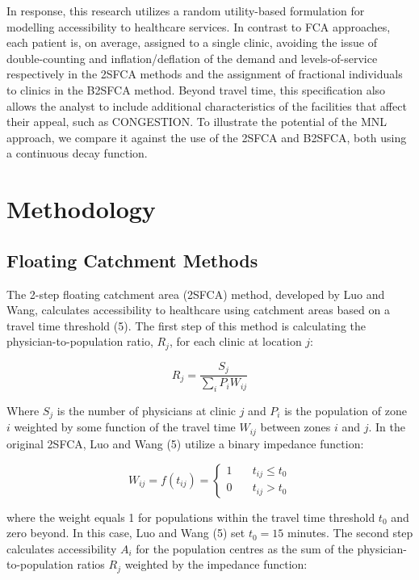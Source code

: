 \documentclass{article}
\begin{document}
In response, this research utilizes a random utility-based formulation
for modelling accessibility to healthcare services. In contrast to FCA
approaches, each patient is, on average, assigned to a single clinic,
avoiding the issue of double-counting and inflation/deflation of the
demand and levels-of-service respectively in the 2SFCA methods and the
assignment of fractional individuals to clinics in the B2SFCA method.
Beyond travel time, this specification also allows the analyst to
include additional characteristics of the facilities that affect their
appeal, such as CONGESTION. To illustrate the potential of the MNL
approach, we compare it against the use of the 2SFCA and B2SFCA, both
using a continuous decay function.

\hypertarget{methodology}{%
\section{Methodology}\label{methodology}}

\hypertarget{floating-catchment-methods}{%
\subsection{Floating Catchment
Methods}\label{floating-catchment-methods}}

The 2-step floating catchment area (2SFCA) method, developed by Luo and
Wang, calculates accessibility to healthcare using catchment areas based
on a travel time threshold (5). The first step of this method is
calculating the physician-to-population ratio, \(R_j\), for each clinic
at location \(j\):

\[
R_j = \frac{S_j}{\sum_i{P_iW_{ij}}}
\]

Where \(S_j\) is the number of physicians at clinic \(j\) and \(P_i\) is
the population of zone \(i\) weighted by some function of the travel
time \(W_{ij}\) between zones \(i\) and \(j\). In the original 2SFCA,
Luo and Wang (5) utilize a binary impedance function:

\[
W_{ij} = f(t_{ij}) = \left\{
        \begin{array}{ll}
            1 & \quad t_{ij} \leq t_0 \\
            0 & \quad t_{ij} > t_0
        \end{array}
    \right.
\]

where the weight equals 1 for populations within the travel time
threshold \(t_0\) and zero beyond. In this case, Luo and Wang (5) set
\(t_0 = 15\) minutes. The second step calculates accessibility \(A_i\)
for the population centres as the sum of the physician-to-population
ratios \(R_j\) weighted by the impedance function:
\end{document}
